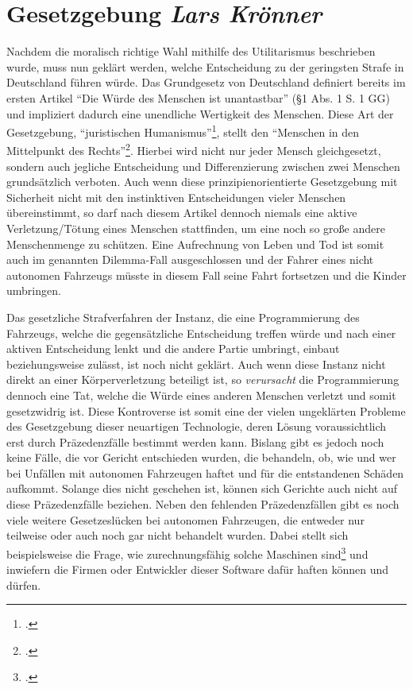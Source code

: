 \documentclass[a4paper, 12pt, openany]{book}
\newcommand\Section[2]{\section[#1 {\scriptsize\itshape#2}]{#1 \footnotesize\itshape#2}}
\begin{document}
        \Section{Gesetzgebung}{Lars Krönner} \label{gesetzgebung}
            Nachdem die moralisch richtige Wahl mithilfe des Utilitarismus beschrieben wurde, muss nun geklärt werden, welche Entscheidung zu der geringsten Strafe in Deutschland führen würde. Das Grundgesetz von Deutschland definiert bereits im ersten Artikel \enquote{Die Würde des Menschen ist unantastbar} (§1 Abs. 1 S. 1 GG) und impliziert dadurch eine unendliche Wertigkeit des Menschen. Diese Art der Gesetzgebung, \enquote{juristischen Humanismus}\footcite[676]{hilgendorf2018dilemma}, stellt den \enquote{Menschen in den Mittelpunkt des Rechts}\footcite[675]{hilgendorf2018dilemma}. Hierbei wird nicht nur jeder Mensch gleichgesetzt, sondern auch jegliche Entscheidung und Differenzierung zwischen zwei Menschen grundsätzlich verboten. Auch wenn diese prinzipienorientierte Gesetzgebung mit Sicherheit nicht mit den instinktiven Entscheidungen vieler Menschen übereinstimmt, so darf nach diesem Artikel dennoch niemals eine aktive Verletzung/Tötung eines Menschen stattfinden, um eine noch so große andere Menschenmenge zu schützen. Eine Aufrechnung von Leben und Tod ist somit auch im genannten Dilemma-Fall ausgeschlossen und der Fahrer eines nicht autonomen Fahrzeugs müsste in diesem Fall seine Fahrt fortsetzen und die Kinder umbringen.\par
            Das gesetzliche Strafverfahren der Instanz, die eine Programmierung des Fahrzeugs, welche die gegensätzliche Entscheidung treffen würde und nach einer aktiven Entscheidung lenkt und die andere Partie umbringt, einbaut beziehungsweise zulässt, ist noch nicht geklärt. Auch wenn diese Instanz nicht direkt an einer Körperverletzung beteiligt ist, so \textit{verursacht} die Programmierung dennoch eine Tat, welche die Würde eines anderen Menschen verletzt und somit gesetzwidrig ist. 
            Diese Kontroverse ist somit eine der vielen ungeklärten Probleme des Gesetzgebung dieser neuartigen Technologie, deren Lösung voraussichtlich erst durch Präzedenzfälle bestimmt werden kann. 
            Bislang gibt es jedoch noch keine Fälle, die vor Gericht entschieden wurden, die behandeln, ob, wie und wer bei Unfällen mit autonomen Fahrzeugen haftet und für die entstandenen Schäden aufkommt. Solange dies nicht geschehen ist, können sich Gerichte auch nicht auf diese Präzedenzfälle beziehen. Neben den fehlenden Präzedenzfällen gibt es noch viele weitere Gesetzeslücken bei autonomen Fahrzeugen, die entweder nur teilweise oder auch noch gar nicht behandelt wurden.
            Dabei stellt sich beispielsweise die Frage, wie zurechnungsfähig solche Maschinen sind\footcite[676]{hilgendorf2018dilemma} und inwiefern die Firmen oder Entwickler dieser Software dafür haften können und dürfen. 
\end{document}

